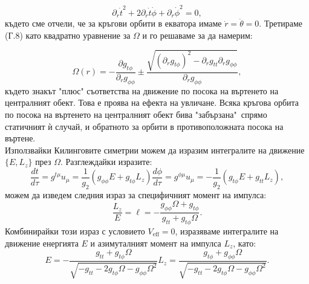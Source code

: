 \begin{appendices}
	\begin{equation}
		\partial_r \dot{t}^2 + 2 \partial_r\dot{t}\dot{\phi} + \partial_r\dot{\phi}^2 = 0,
	\end{equation}
	където сме отчели, че за кръгови орбити в екватора имаме $\dot{r} = \dot{\theta} = 0$. Третираме (Г.8) като квадратно уравнение за $\Omega$ и го решаваме за да намерим:
	
	\begin{equation}
		\Omega(r) = -\frac{\partial g_{t\phi}}{\partial_r g_{\phi\phi}} \pm\frac{\sqrt{\left(\partial_r g_{t\phi}\right)^2 - \partial_rg_{tt}\partial_rg_{\phi\phi}}}{\partial_r g_{\phi\phi}},
	\end{equation}
	където знакът "плюс" съответства на движение по посока на въртенето на централният обект. Това е проява на ефекта на увличане. Всяка кръгова орбита по посока на въртенето на централният обект бива "забързана"$\,$ спрямо статичният ѝ случай, и обратното за орбити в противоположната посока на въртене. \\
	
	Използвайки Килинговите симетрии можем да изразим интегралите на движение $\{E,L_z\}$ през $\Omega$. Разглеждайки изразите:
	\begin{subequations}
		\begin{equation}
			\frac{dt}{d\tau}=g^{t\mu}u_{\mu}=\frac{1}{g_2}\left(g_{\phi\phi}E+g_{t\phi}L_z\right)
		\end{equation}
		\begin{equation}
			\frac{d\phi}{d\tau}=g^{\phi\mu}u_\mu=-\frac{1}{g_2}\left(g_{t\phi}E+g_{tt}L_z\right),
		\end{equation}
	\end{subequations}
	можем да изведем следния израз за специфичният момент на импулса:
	\begin{equation}
		\frac{L_z}{E}=\ell=-\frac{g_{\phi\phi}\Omega+g_{t\phi}}{g_{tt}+g_{t\phi}\Omega}.
	\end{equation}
	Комбинирайки този израз с условието $V_\text{eff} = 0$, изразяваме интегралите на движение енергията $E$ и азимуталният момент на импулса $L_z$, като:
	\begin{subequations}
		\begin{equation}
			E=-\frac{g_{tt}+g_{t\phi}\Omega}{\sqrt{-g_{tt}-2g_{t\phi}\Omega-g_{\phi\phi}\Omega^2}}
		\end{equation}
		\begin{equation}
			L_z=\frac{g_{t\phi} +g_{\phi\phi}\Omega}{\sqrt{-g_{tt}-2g_{t\phi}\Omega-g_{\phi\phi}\Omega^2}}.
		\end{equation}
	\end{subequations}
	
\end{appendices}
